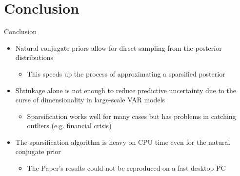 \section{Conclusion}

\begin{frame}{Conclusion}
    \begin{itemize}
        \item Natural conjugate priors allow for direct sampling from the posterior distributions
            \begin{itemize}
                \item This speeds up the process of approximating a sparsified posterior
            \end{itemize}
        \item Shrinkage alone is not enough to reduce predictive uncertainty due to the curse of dimensionality in large-scale VAR models
            \begin{itemize}
                \item Sparsification works well for many cases but has problems in catching outliers (e.g. financial crisis)
            \end{itemize}
        \item The sparsification algorithm is heavy on CPU time even for the natural conjugate prior
            \begin{itemize}
                \item The Paper's results could not be reproduced on a fast desktop PC
            \end{itemize}
    \end{itemize}
\end{frame}

